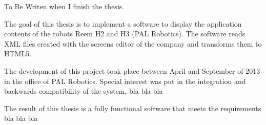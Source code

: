 % 
% 
%
To Be Writen when I finish the thesis.

The goal of this thesis is to implement a software to display the application
contents of the robots Reem H2 and H3 (PAL Robotics). The software reads XML 
files created with the screens editor of the company and transforms them to HTML5.

The development of this project took place between April and September of 
2013 in the office of PAL Robotics. Special interest was put in the integration
and backwards compatibility of the system, bla bla bla

The result of this thesis is a fully functional software that meets the 
requirements bla bla bla


